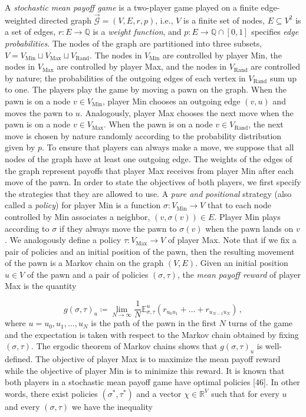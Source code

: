 A \emph{stochastic mean payoff game} is a two-player game played on a finite edge-weighted directed graph $\vec{\mathcal{G}}=(V,E,r,p)$, i.e., $V$ is a finite set of nodes, $E\subseteq V^{2}$ is a set of edges, $r\colon E\to{\mathbb{Q}}$ is a \emph{weight function}, and $p\colon E\to{\mathbb{Q}}\cap[0,1]$ specifies \emph{edge probabilities}. The nodes of the graph are partitioned into three subsets, $V=V_{\mathrm{Min}}\sqcup V_{\mathrm{Max}}\sqcup V_{\mathrm{Rand}}$. The nodes in $V_{\mathrm{Min}}$ are controlled by player Min, the nodes in $V_{\mathrm{Max}}$ are controlled by player Max, and the nodes in $V_{\mathrm{Rand}}$ are controlled by nature; the probabilities of the outgoing edges of each vertex in $V_{\mathrm{Rand}}$ sum up to one. The players play the game by moving a pawn on the graph. When the pawn is on a node $v\in V_{\mathrm{Min}}$, player Min chooses an outgoing edge $(v,u)$ and moves the pawn to $u$. Analogously, player Max chooses the next move when the pawn is on a node $v\in V_{\mathrm{Max}}$. When the pawn is on a node $v\in V_{\mathrm{Rand}}$, the next move is chosen by nature randomly according to the probability distribution given by $p$. To ensure that players can always make a move, we suppose that all nodes of the graph have at least one outgoing edge. The weights of the edges of the graph represent payoffs that player Max receives from player Min after each move of the pawn. In order to state the objectives of both players, we first specify the strategies that they are allowed to use. A \emph{pure and positional} strategy (also called a \emph{policy}) for player Min is a function $\sigma\colon V_{\mathrm{Min}}\to V$ that to each node controlled by Min associates a neighbor, $(v,\sigma(v))\in E$. Player Min plays according to $\sigma$ if they always move the pawn to $\sigma(v)$ when the pawn lands on $v$. We analogously define a policy $\tau\colon V_{\mathrm{Max}}\to V$ of player Max. Note that if we fix a pair of policies and an initial position of the pawn, then the resulting movement of the pawn is a Markov chain on the graph $(V,E)$. Given an initial position $u\in V$ of the pawn and a pair of policies $(\sigma,\tau)$, the \emph{mean payoff reward} of player Max is the quantity


\[
g(\sigma,\tau)_{u}\coloneqq\lim_{N\to\infty}\frac{1}{N}\mathbb{E}^{u}_{\sigma,\tau}(r_{u_{0}u_{1}}+\dots+r_{u_{N-1}u_{N}})\,,
\]
where $u=u_{0},u_{1},\dots,u_{N}$ is the path of the pawn in the first $N$ turns of the game and the expectation is taken with respect to the Markov chain obtained by fixing $(\sigma,\tau)$. The ergodic theorem of Markov chains shows that $g(\sigma,\tau)_{u}$ is well-defined. The objective of player Max is to maximize the mean payoff reward while the objective of player Min is to minimize this reward. It is known that both players in a stochastic mean payoff game have optimal policies [46]. In other words, there exist policies $(\sigma^{*},\tau^{*})$ and a vector $\chi\in\mathbb{R}^{V}$ such that for every $u$ and every $(\sigma,\tau)$ we have the inequality


